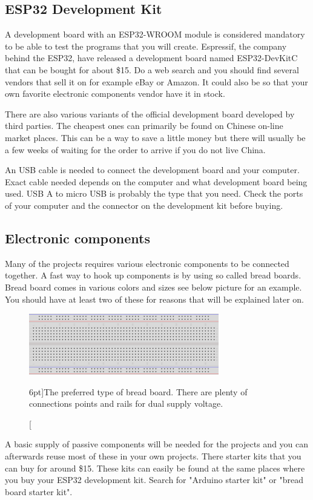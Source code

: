 \documentclass{tufte-book}
\begin{document}
	\subsection{ESP32 Development Kit}
	A development board with an ESP32-WROOM module is considered mandatory to be able to test the programs that you will create. Espressif, the company behind the ESP32, have released a development board named ESP32-DevKitC that can be bought for about \$15. Do a web search and you should find several vendors that sell it on for example eBay or Amazon. It could also be so that your own favorite electronic components vendor have it in stock.
	
	There are also various variants of the official development board developed by third parties. The cheapest ones can primarily be found on Chinese on-line market places. This can be a way to save a little money but there will usually be a few weeks of waiting for the order to arrive if you do not live China.
	
	An USB cable is needed to connect the development board and your computer. Exact cable needed depends on the computer and what development board being used. USB A to micro USB is probably the type that you need. Check the ports of your computer and the connector on the development kit before buying.
	
	\subsection{Electronic components}
	Many of the projects requires various electronic components to be connected together. A fast way to hook up components is by using so called bread boards. Bread board comes in various colors and sizes see below picture for an example. You should have at least two of these for reasons that will be explained later on.
	
	\begin{figure}
		\includegraphics{bread_board.png}
		\caption[Bread board $n$.][6pt]{The preferred type of bread board. There are plenty of connections points and rails for dual supply voltage.}
		\label{fig:textfig}
	\end{figure}
	
	A basic supply of passive components will be needed for the projects and you can afterwards reuse most of these in your own projects. There starter kits that you can buy for around \$15. These kits can easily be found at the same places where you buy your ESP32 development kit. Search for "Arduino starter kit" or "bread board starter kit".
	
\end{document}
